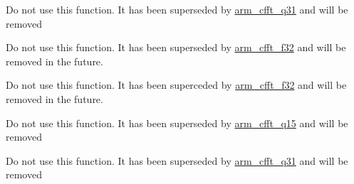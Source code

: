 \begin{DoxyRefList}
\item[\label{deprecated__deprecated000006}%
\hypertarget{deprecated__deprecated000006}{}%
Member \hyperlink{group__ComplexFFT_ga6321f703ec87a274aedaab33d3e766b4}{arm\+\_\+cfft\+\_\+radix2\+\_\+q31} (const arm\+\_\+cfft\+\_\+radix2\+\_\+instance\+\_\+q31 $\ast$S, q31\+\_\+t $\ast$p\+Src)]Do not use this function. It has been superseded by \hyperlink{group__ComplexFFT_ga5a0008bd997ab6e2e299ef2fb272fb4b}{arm\+\_\+cfft\+\_\+q31} and will be removed  
\item[\label{deprecated__deprecated000007}%
\hypertarget{deprecated__deprecated000007}{}%
Member \hyperlink{group__ComplexFFT_ga521f670cd9c571bc61aff9bec89f4c26}{arm\+\_\+cfft\+\_\+radix4\+\_\+f32} (const arm\+\_\+cfft\+\_\+radix4\+\_\+instance\+\_\+f32 $\ast$S, float32\+\_\+t $\ast$p\+Src)]Do not use this function. It has been superseded by \hyperlink{group__ComplexFFT_gade0f9c4ff157b6b9c72a1eafd86ebf80}{arm\+\_\+cfft\+\_\+f32} and will be removed in the future.  
\item[\label{deprecated__deprecated000008}%
\hypertarget{deprecated__deprecated000008}{}%
Member \hyperlink{group__ComplexFFT_gaf336459f684f0b17bfae539ef1b1b78a}{arm\+\_\+cfft\+\_\+radix4\+\_\+init\+\_\+f32} (arm\+\_\+cfft\+\_\+radix4\+\_\+instance\+\_\+f32 $\ast$S, uint16\+\_\+t fft\+Len, uint8\+\_\+t ifft\+Flag, uint8\+\_\+t bit\+Reverse\+Flag)]Do not use this function. It has been superceded by \hyperlink{group__ComplexFFT_gade0f9c4ff157b6b9c72a1eafd86ebf80}{arm\+\_\+cfft\+\_\+f32} and will be removed in the future.  
\item[\label{deprecated__deprecated000009}%
\hypertarget{deprecated__deprecated000009}{}%
Member \hyperlink{group__ComplexFFT_ga0c2acfda3126c452e75b81669e8ad9ef}{arm\+\_\+cfft\+\_\+radix4\+\_\+init\+\_\+q15} (arm\+\_\+cfft\+\_\+radix4\+\_\+instance\+\_\+q15 $\ast$S, uint16\+\_\+t fft\+Len, uint8\+\_\+t ifft\+Flag, uint8\+\_\+t bit\+Reverse\+Flag)]Do not use this function. It has been superseded by \hyperlink{group__ComplexFFT_ga68cdacd2267a2967955e40e6b7ec1229}{arm\+\_\+cfft\+\_\+q15} and will be removed  
\item[\label{deprecated__deprecated000010}%
\hypertarget{deprecated__deprecated000010}{}%
Member \hyperlink{group__ComplexFFT_gad5caaafeec900c8ff72321c01bbd462c}{arm\+\_\+cfft\+\_\+radix4\+\_\+init\+\_\+q31} (arm\+\_\+cfft\+\_\+radix4\+\_\+instance\+\_\+q31 $\ast$S, uint16\+\_\+t fft\+Len, uint8\+\_\+t ifft\+Flag, uint8\+\_\+t bit\+Reverse\+Flag)]Do not use this function. It has been superseded by \hyperlink{group__ComplexFFT_ga5a0008bd997ab6e2e299ef2fb272fb4b}{arm\+\_\+cfft\+\_\+q31} and will be removed  

\end{DoxyRefList}
